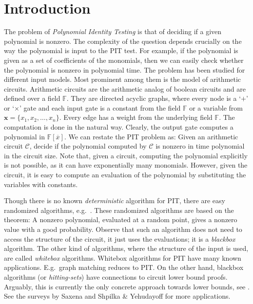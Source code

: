\documentclass[final,oneeqnum, onethmnum, onefignum]{siamltex1213}
\newcommand{\F}{\mathbb F}
\newcommand{\C}{\mathcal C}
\newcommand{\lis}[3]{{#1}_1 #2 {#1}_2 #2\dots #2 {#1}_{#3}}
\renewcommand{\o}[1]{\overline{#1}}
\begin{document}

\section{Introduction}
The problem of {\em Polynomial Identity Testing} is that of
deciding if a given polynomial is nonzero. The complexity of 
the question depends crucially on the way the polynomial is input to the PIT test.
For example, if the polynomial is given as a set of coefficients
of the monomials, then we can easily check whether the polynomial is nonzero
in polynomial time. 
The problem has been studied for different input models.
Most prominent among them is the model of arithmetic circuits. 
Arithmetic circuits are the arithmetic analog of boolean circuits
and are defined over a field $\F$.
They are directed acyclic graphs, where every node
is a `$+$' or `$\times$' gate and each input gate is 
a constant from the field $\F$ or a variable from
$\mathbf{x} = \{\lis{x}{,}{n}\}$. 
Every edge has a weight from the underlying field $\F$.
The computation is done in the natural way.
Clearly, the output gate computes a polynomial
in $\F[\o{x}]$. 
We can restate the PIT problem as: Given an arithmetic circuit $\C$, 
decide if the polynomial computed by $\C$ is nonzero in time polynomial
in the circuit size. 
Note that, given a circuit, computing the polynomial explicitly
is not possible, as it can have exponentially many monomials. 
However, given the circuit, 
it is easy to compute an evaluation of the polynomial
by substituting the variables with constants. 

Though there is no known {\em deterministic} algorithm for PIT,
there are easy randomized algorithms, e.g.\ \cite{Sch80}.
These randomized algorithms are based on the theorem:
A nonzero polynomial,
evaluated at a random point, gives a nonzero value with a good probability. 
Observe that such an algorithm does not need to access 
the structure of the circuit, it just uses the evaluations;
it is a {\em blackbox} algorithm.
The other kind of algorithms, where the structure of the
input is used, are called {\em whitebox} algorithms. 
Whitebox algorithms for PIT have many known applications. E.g.\ graph matching reduces to PIT.
On the other hand, blackbox algorithms (or \emph{hitting-sets}) have connections to circuit lower bound proofs. Arguably, this is currently the only concrete approach towards lower bounds, see \cite{mul12, Mul12b}. See the surveys by Saxena \cite{Sax09, Sax14} and Shpilka \& Yehudayoff \cite{SY10} for more
applications.
\end{document}
